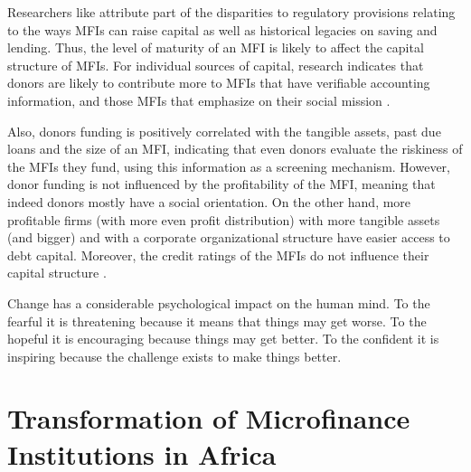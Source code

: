\documentclass[a4paper, nobind]{templates/ociamthesis}
\begin{document}
Researchers like \textcite{bayai2016financing} attribute part of the disparities to regulatory provisions relating to the ways MFIs can raise capital as well as historical legacies on saving and lending. Thus, the level of maturity of an MFI is likely to affect the capital structure of MFIs. For individual sources of capital, research indicates that donors are likely to contribute more to MFIs that have verifiable accounting information, and those MFIs that emphasize on their social mission \textcite{hudon2010management}.

Also, donors funding is positively correlated with the tangible assets, past due loans and the size of an MFI, indicating that even donors evaluate the riskiness of the MFIs they fund, using this information as a screening mechanism. However, donor funding is not influenced by the profitability of the MFI, meaning that indeed donors mostly have a social orientation. On the other hand, more profitable firms (with more even profit distribution) with more tangible assets (and bigger) and with a corporate organizational structure have easier access to debt capital. Moreover, the credit ratings of the MFIs do not influence their capital structure \autocite{tchuigoua2014institutional}.

\begin{savequote}
Change has a considerable psychological impact on the human mind. To the
fearful it is threatening because it means that things may get worse. To
the hopeful it is encouraging because things may get better. To the
confident it is inspiring because the challenge exists to make things
better.
\end{savequote}



\hypertarget{transformation-of-microfinance-institutions-in-africa}{%
\chapter{Transformation of Microfinance Institutions in Africa}\label{transformation-of-microfinance-institutions-in-africa}}

\minitoc 
\end{document}
